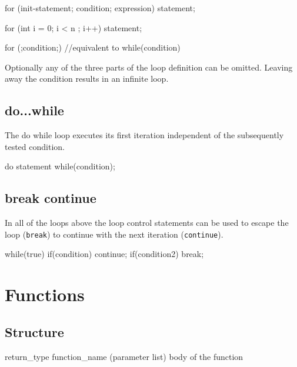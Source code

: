\documentclass[10pt,a4paper]{scrartcl}
\begin{document}
\begin{multicols*}{2}
\begin{TPCpp}
for (init-statement; condition; expression){
	statement;
}

for (int i = 0; i < n ; i++){
	statement;
}

for (;condition;) {
	//equivalent to while(condition)
}
\end{TPCpp}

Optionally any of the three parts of the loop definition can be omitted. Leaving away the condition results in an infinite loop.

\subsection{do...while}

The do while loop executes its first iteration independent of the subsequently tested condition.

\begin{TPCpp}
do {
	statement
} while(condition);
\end{TPCpp}

\subsection{break continue}

In all of the loops above the loop control statements can be used to escape the loop (\verb+break+) to continue with the next iteration (\verb+continue+).

\begin{TPCpp}
while(true){
	if(condition){
		continue;
	}
	if(condition2){
		break;	
	}
}
\end{TPCpp}

\section{Functions}

\subsection{Structure}

\begin{TPCpp}
return_type function_name (parameter list) {
	body of the function
}
\end{TPCpp}


\end{multicols*}
\end{document}
